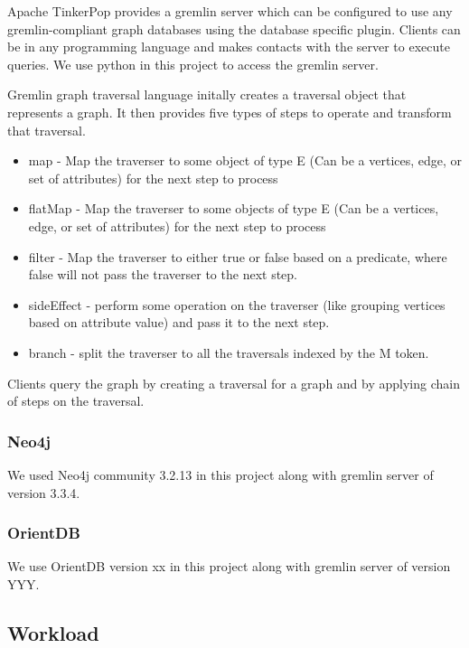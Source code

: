 Apache TinkerPop provides a gremlin server which can be configured to use any gremlin-compliant graph databases using the database specific plugin. Clients can be in any programming language and makes contacts with the server to execute queries. We use python in this project to access the gremlin server.

Gremlin graph traversal language initally creates a traversal object that represents a graph. It then provides five types of steps to operate and transform  that traversal. 

\begin{itemize}
\item map - Map the traverser to some object of type E (Can be a vertices, edge, or set of attributes) for the next step to process
\item flatMap - Map the traverser to some objects of type E (Can be a vertices, edge, or set of attributes) for the next step to process
\item filter - Map the traverser to either true or false based on a predicate, where false will not pass the traverser to the next step.
\item sideEffect - perform some operation on the traverser (like grouping vertices based on attribute value) and pass it to the next step. 
\item branch - split the traverser to all the traversals indexed by the M token.
\end{itemize}

Clients query the graph by creating a traversal for a graph and by applying chain of steps on the traversal.

\subsubsection{Neo4j}

We used Neo4j community 3.2.13 in this project along with gremlin server of version 3.3.4.

\subsubsection{OrientDB}

We use OrientDB version xx in this project along with gremlin server of version YYY.

\subsection{Workload}


